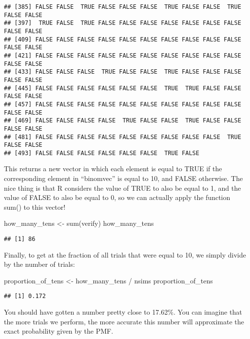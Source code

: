 \documentclass[
]{book}
\newenvironment{Shaded}{\begin{snugshade}}{\end{snugshade}}
\newcommand{\FunctionTok}[1]{\textcolor[rgb]{0.00,0.00,0.00}{#1}}
\newcommand{\NormalTok}[1]{#1}
\newcommand{\OtherTok}[1]{\textcolor[rgb]{0.56,0.35,0.01}{#1}}
\newcommand{\SpecialCharTok}[1]{\textcolor[rgb]{0.00,0.00,0.00}{#1}}
\begin{document}
\begin{verbatim}
## [385] FALSE FALSE  TRUE FALSE FALSE FALSE  TRUE FALSE FALSE  TRUE FALSE FALSE
## [397]  TRUE FALSE  TRUE FALSE FALSE FALSE FALSE FALSE FALSE FALSE FALSE FALSE
## [409] FALSE FALSE FALSE FALSE FALSE FALSE FALSE FALSE FALSE FALSE FALSE FALSE
## [421] FALSE FALSE FALSE FALSE FALSE FALSE FALSE FALSE FALSE FALSE FALSE FALSE
## [433] FALSE FALSE FALSE  TRUE FALSE FALSE  TRUE FALSE FALSE FALSE FALSE FALSE
## [445] FALSE FALSE FALSE FALSE FALSE FALSE  TRUE  TRUE FALSE FALSE FALSE FALSE
## [457] FALSE FALSE FALSE FALSE FALSE FALSE FALSE FALSE FALSE FALSE FALSE FALSE
## [469] FALSE FALSE FALSE FALSE  TRUE FALSE FALSE  TRUE FALSE FALSE FALSE FALSE
## [481] FALSE FALSE FALSE FALSE FALSE FALSE FALSE FALSE FALSE  TRUE FALSE FALSE
## [493] FALSE FALSE FALSE FALSE FALSE FALSE  TRUE FALSE
\end{verbatim}

This returns a new vector in which each element is equal to TRUE if the corresponding element in ``binomvec'' is equal to 10, and FALSE otherwise. The nice thing is that R considers the value of TRUE to also be equal to 1, and the value of FALSE to also be equal to 0, so we can actually apply the function sum() to this vector!

\begin{Shaded}
\begin{Highlighting}[]
\NormalTok{how\_many\_tens }\OtherTok{\textless{}{-}} \FunctionTok{sum}\NormalTok{(verify)}
\NormalTok{how\_many\_tens}
\end{Highlighting}
\end{Shaded}

\begin{verbatim}
## [1] 86
\end{verbatim}

Finally, to get at the fraction of all trials that were equal to 10, we simply divide by the number of trials:

\begin{Shaded}
\begin{Highlighting}[]
\NormalTok{proportion\_of\_tens }\OtherTok{\textless{}{-}}\NormalTok{ how\_many\_tens }\SpecialCharTok{/}\NormalTok{ nsims}
\NormalTok{proportion\_of\_tens}
\end{Highlighting}
\end{Shaded}

\begin{verbatim}
## [1] 0.172
\end{verbatim}

You should have gotten a number pretty close to 17.62\%. You can imagine that the more trials we perform, the more accurate this number will approximate the exact probability given by the PMF.
\end{document}

